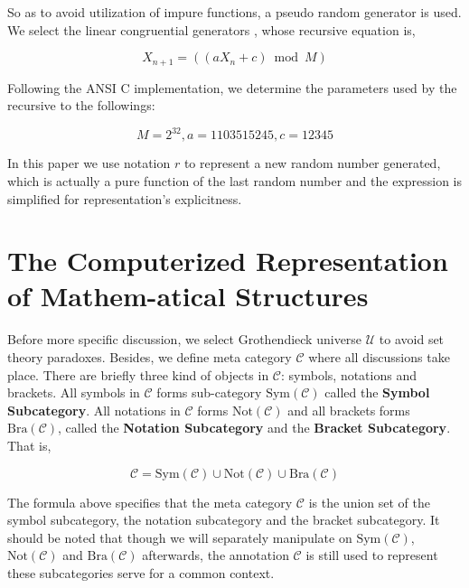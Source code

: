 \documentclass{aims}
\numberwithin{equation}{section}
\numberwithin{theorem}{section}	%
\numberwithin{axiom}{section}	%
\numberwithin{definition}{section}	%
\begin{document}
	So as to avoid utilization of impure functions, a pseudo random generator is used. We select the linear congruential generators \cite{Entacher1997}, whose recursive equation is,
	
	\begin{equation*}
		X_{n+1}=(\left(a X_n+c\right) \bmod M)
	\end{equation*}
	
	Following the ANSI C implementation, we determine the parameters used by the recursive to the followings:
	
	\begin{equation*}
		M=2^{32},a=1103515245, c=12345
	\end{equation*}
	
	In this paper we use notation \(\mathit{r}\) to represent a new random number generated, which is actually a pure function of the last random number and the expression is simplified for representation{'}s explicitness.
	
	\section{The Computerized Representation of Mathem-atical Structures}
	
	Before more specific discussion, we select Grothendieck universe \(\mathcal{U}\) \cite{Li2019} to avoid set theory paradoxes. Besides, we define meta category \(\mathcal{C}\) where all discussions take place. There are briefly three kind of objects in \(\mathcal{C}\): symbols, notations and brackets. All symbols in \(\mathcal{C}\) forms sub-category \(\text{Sym}(\mathcal{C})\) called the \textbf{ Symbol Subcategory}. All notations in \(\mathcal{C}\) forms \(\text{Not}(\mathcal{C})\) and all brackets forms \(\text{Bra}(\mathcal{C})\), called the \textbf{ Notation Subcategory} and the \textbf{ Bracket Subcategory}. That is,
	
	\begin{equation}
		\mathcal{C}=\text{Sym}(\mathcal{C})\cup \text{Not}(\mathcal{C})\cup \text{Bra}(\mathcal{C})
	\end{equation}
	
	The formula above specifies that the meta category \(\mathcal{C}\) is the union set of the symbol subcategory, the notation subcategory and the bracket subcategory. It should be noted that though we will separately manipulate on \(\text{Sym}(\mathcal{C})\), \(\text{Not}(\mathcal{C})\) and \(\text{Bra}(\mathcal{C})\) afterwards, the annotation \(\mathcal{C}\) is still used to represent these subcategories serve for a common context.
	
\end{document}
